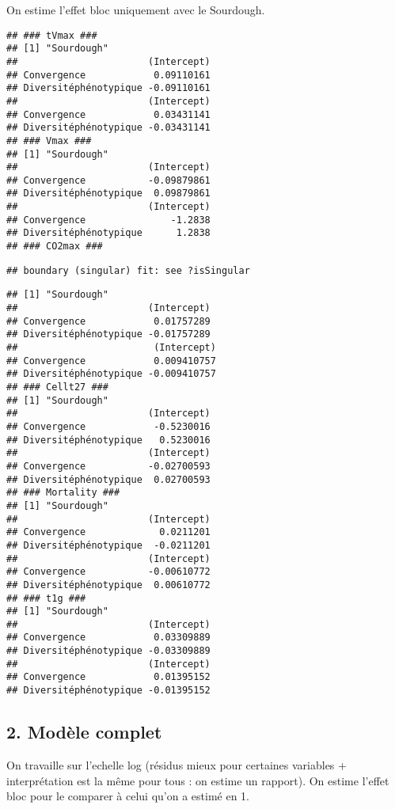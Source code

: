 \documentclass[
]{article}
\begin{document}
On estime l'effet bloc uniquement avec le Sourdough.

\begin{verbatim}
## ### tVmax ###
## [1] "Sourdough"
##                       (Intercept)
## Convergence            0.09110161
## Diversitéphénotypique -0.09110161
##                       (Intercept)
## Convergence            0.03431141
## Diversitéphénotypique -0.03431141
## ### Vmax ###
## [1] "Sourdough"
##                       (Intercept)
## Convergence           -0.09879861
## Diversitéphénotypique  0.09879861
##                       (Intercept)
## Convergence               -1.2838
## Diversitéphénotypique      1.2838
## ### CO2max ###
\end{verbatim}

\begin{verbatim}
## boundary (singular) fit: see ?isSingular
\end{verbatim}

\begin{verbatim}
## [1] "Sourdough"
##                       (Intercept)
## Convergence            0.01757289
## Diversitéphénotypique -0.01757289
##                        (Intercept)
## Convergence            0.009410757
## Diversitéphénotypique -0.009410757
## ### Cellt27 ###
## [1] "Sourdough"
##                       (Intercept)
## Convergence            -0.5230016
## Diversitéphénotypique   0.5230016
##                       (Intercept)
## Convergence           -0.02700593
## Diversitéphénotypique  0.02700593
## ### Mortality ###
## [1] "Sourdough"
##                       (Intercept)
## Convergence             0.0211201
## Diversitéphénotypique  -0.0211201
##                       (Intercept)
## Convergence           -0.00610772
## Diversitéphénotypique  0.00610772
## ### t1g ###
## [1] "Sourdough"
##                       (Intercept)
## Convergence            0.03309889
## Diversitéphénotypique -0.03309889
##                       (Intercept)
## Convergence            0.01395152
## Diversitéphénotypique -0.01395152
\end{verbatim}

\hypertarget{moduxe8le-complet}{%
\subsection{2. Modèle complet}\label{moduxe8le-complet}}

On travaille sur l'echelle log (résidus mieux pour certaines variables +
interprétation est la même pour tous : on estime un rapport). On estime
l'effet bloc pour le comparer à celui qu'on a estimé en 1.
\end{document}
